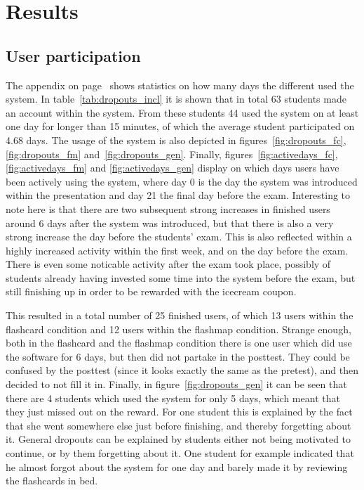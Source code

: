 \chapter{Results}
\label{ch:results}

\section{User participation}

The  appendix on page~\pageref{app:dropouts} shows statistics on how many days the different used the system. In table~\ref{tab:dropouts_incl} it is shown that in total 63 students made an account within the system. From these students 44 used the system on at least one day for longer than 15 minutes, of which the average student participated on 4.68 days. The usage of the system is also depicted in figures~\ref{fig:dropouts_fc}, \ref{fig:dropouts_fm} and~\ref{fig:dropouts_gen}. Finally, figures~\ref{fig:activedays_fc}, \ref{fig:activedays_fm} and \ref{fig:activedays_gen} display on which days users have been actively using the system, where day 0 is the day the system was introduced within the presentation and day 21 the final day before the exam. Interesting to note here is that there are two subsequent strong increases in finished users around 6 days after the system was introduced, but that there is also a very strong increase the day before the students' exam. This is also reflected within a highly increased activity within the first week, and on the day before the exam. There is even some noticable activity after the exam took place, possibly of students already having invested some time into the system before the exam, but still finishing up in order to be rewarded with the icecream coupon.

This resulted in a total number of 25 finished users, of which 13 users within the flashcard condition and 12 users within the flashmap condition. Strange enough, both in the flashcard and the flashmap condition there is one user which did use the software for 6 days, but then did not partake in the posttest. They could be confused by the posttest (since it looks exactly the same as the pretest), and then decided to not fill it in. Finally, in figure~\ref{fig:dropouts_gen} it can be seen that there are 4 students which used the system for only 5 days, which meant that they just missed out on the reward. For one student this is explained by the fact that she went somewhere else just before finishing, and thereby forgetting about it. General dropouts can be explained by students either not being motivated to continue, or by them forgetting about it. One student for example indicated that he almost forgot about the system for one day and barely made it by reviewing the flashcards in bed.

